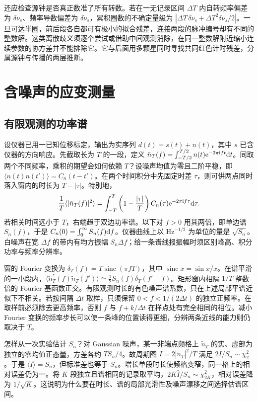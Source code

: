 还应检查源钟是否真正数准了所有转数。若在一无记录区间 $\Delta T$ 内自转频率偏差为 $\delta\nu_s$、频率导数偏差为 $\delta\dot\nu_s$，累积圈数的不确定量级为 $|\Delta T\,\delta\nu_s+\Delta T^2\delta\dot\nu_s/2|$。一旦可达半圈，前后段各自都可有极小的拟合残差，连接两段的脉冲编号却有不同的整数解。这类离散歧义须逐个尝试或借助中间观测消除，在同一整数解附近缩小连续参数的协方差并不能排除它。它与后面用多颗星同时寻找共同红色计时残差，分属源钟与传播的两层推断。

\section{含噪声的应变测量}\label{sec:gw-b-spectrum}
\subsection{有限观测的功率谱}
设仪器已用一已知位移标定，输出为实序列 $d(t)=s(t)+n(t)$，其中 $s$ 已含仪器的方向响应。先截取长为 $T$ 的一段，定义 $\tilde n_T(f)=\int_{-T/2}^{T/2}n(t)\mathrm{e}^{-2\pi\mathrm{i} ft}\dd t$。同取两个不同频率，乘积的期望会如何依赖 $T$？设噪声均值为零且二阶平稳，即 $\langle n(t)n(t')\rangle=C_n(t-t')$。在两个时间积分中先固定时差 $\tau$，则可供两点同时落入窗内的时长为 $T-|\tau|$。特别地，
\[
 \frac{1}{T}\langle|\tilde n_T(f)|^2\rangle
 =\int_{-T}^{T}\left(1-\frac{|\tau|}{T}\right) C_n(\tau)\mathrm{e}^{-2\pi\mathrm{i} f\tau}\dd\tau .
\]
若相关时间远小于 $T$，右端趋于双边功率谱。以下对 $f>0$ 用其两倍，即单边谱 $S_n(f)$，于是 $C_n(0)=\int_0^\infty S_n(f)\dd f$。仪器曲线上以 $\mathrm{Hz}^{-1/2}$ 为单位的量是 $\sqrt{S_n}$。白噪声在宽 $\Delta f$ 的带内有均方振幅 $S_n\Delta f$；给一条谱线报振幅时须区别峰高、积分功率与频率分辨率。

窗的 Fourier 变换为 $\delta_T(f)=T\operatorname{sinc}(\pi fT)$，其中 $\operatorname{sinc}x=\sin x/x$。在谱平滑的一小段内，$\langle\tilde n_T^*(f)\tilde n_T(f')\rangle\simeq\tfrac12 S_n(f)\delta_T(f'-f)$。矩形窗内相隔 $1/T$ 整数倍的 Fourier 基函数正交。有限观测时长的有色噪声谱系数，只在上述局部平谱近似下不相关。若按间隔 $\Delta t$ 取样，只须保留 $0<f<1/(2\Delta t)$ 的独立正频率。在取样前必须除去更高频率，否则 $f$ 与 $f+k/\Delta t$ 在样点处有完全相同的相位。减小 Fourier 变换的频率步长可以使一条峰的位置读得更细，分辨两条近线的能力则仍取决于 $T$。

怎样从一次实验估计 $S_n$？对 Gaussian 噪声，某一非端点频格上 $\tilde n_T$ 的实、虚部为独立的零均值正态量，方差各约 $TS_n/4$。故周期图 $I=2|\tilde n_T|^2/T$ 满足 $2I/S_n\sim\chi^2_2$。于是 $\langle I\rangle=S_n$，但标准差也等于 $S_n$。增长单段时长使频格变窄，同一格上的相对误差仍为一。将 $K$ 段独立且谱相同的记录取平均，$2K\bar I/S_n\sim\chi^2_{2K}$，相对误差降为 $1/\sqrt K$。这说明为什么要在时长、谱的局部光滑性及噪声漂移之间选择估谱区间。

